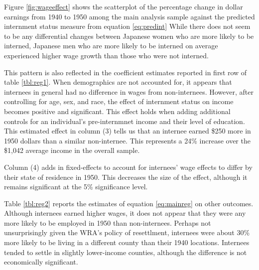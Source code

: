 Figure \ref{fig:wageeffect} shows the scatterplot of the percentage change in dollar earnings from 1940 to 1950 among the main analysis sample
against the predicted internment status measure from equation \ref{eq:predint}
While there does not seem to be any differential changes between Japanese women who are more likely to be interned,
Japanese men who are more likely to be interned on average experienced higher wage growth than those who were not interned.

This pattern is also reflected in the coefficient estimates reported in first row of table \ref{tbl:reg1}.
When demographics are not accounted for, it appears that internees in general had no difference in wages from non-internees.
However, after controlling for age, sex, and race, the effect of internment status on income becomes positive and significant.
This effect holds when adding additional controls for an individual's pre-internmnet income and their level of education.
This estimated effect in column (3) tells us that 
an internee earned \$250 more in 1950 dollars than a similar non-internee.
This represents a 24\% increase over the \$1,042 average income in the overall sample. 

Column (4) adds in fixed-effects to account for internees' wage effects to differ by their state of residence in 1950.
This decreases the size of the effect, although it remains significant at the 5\% significance level.

Table \ref{tbl:reg2} reports the estimates of equation \ref{eq:mainreg} on other outcomes.
Although internees earned higher wages, it does not appear that they were any more likely to be employed in 1950 than non-internees.
Perhaps not unsurprisingly given the WRA's policy of resettlment, internees were about 30\% more likely to be living in a different county than their 1940 locations.
Internees tended to settle in slightly lower-income counties, although the difference is not economically significant.
